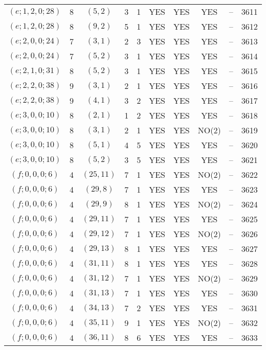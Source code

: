 \begin{longtable}{|c|c|c|c|c|c|c|c|c|c|}
$(e; 1, 2, 0; 28)$ & 8 & $(5, 2)$ & 3 & 1 & YES & YES & YES & -- & 3611\\
$(e; 1, 2, 0; 28)$ & 8 & $(9, 2)$ & 5 & 1 & YES & YES & YES & -- & 3612\\
$(e; 2, 0, 0; 24)$ & 7 & $(3, 1)$ & 2 & 3 & YES & YES & YES & -- & 3613\\
$(e; 2, 0, 0; 24)$ & 7 & $(5, 2)$ & 3 & 1 & YES & YES & YES & -- & 3614\\
$(e; 2, 1, 0; 31)$ & 8 & $(5, 2)$ & 3 & 1 & YES & YES & YES & -- & 3615\\
$(e; 2, 2, 0; 38)$ & 9 & $(3, 1)$ & 2 & 1 & YES & YES & YES & -- & 3616\\
$(e; 2, 2, 0; 38)$ & 9 & $(4, 1)$ & 3 & 2 & YES & YES & YES & -- & 3617\\
$(e; 3, 0, 0; 10)$ & 8 & $(2, 1)$ & 1 & 2 & YES & YES & YES & -- & 3618\\
$(e; 3, 0, 0; 10)$ & 8 & $(3, 1)$ & 2 & 1 & YES & YES & NO(2) & -- & 3619\\
$(e; 3, 0, 0; 10)$ & 8 & $(5, 1)$ & 4 & 5 & YES & YES & YES & -- & 3620\\
$(e; 3, 0, 0; 10)$ & 8 & $(5, 2)$ & 3 & 5 & YES & YES & YES & -- & 3621\\
$(f; 0, 0, 0; 6)$ & 4 & $(25, 11)$ & 7 & 1 & YES & YES & NO(2) & -- & 3622\\
$(f; 0, 0, 0; 6)$ & 4 & $(29, 8)$ & 7 & 1 & YES & YES & YES & -- & 3623\\
$(f; 0, 0, 0; 6)$ & 4 & $(29, 9)$ & 8 & 1 & YES & YES & NO(2) & -- & 3624\\
$(f; 0, 0, 0; 6)$ & 4 & $(29, 11)$ & 7 & 1 & YES & YES & YES & -- & 3625\\
$(f; 0, 0, 0; 6)$ & 4 & $(29, 12)$ & 7 & 1 & YES & YES & NO(2) & -- & 3626\\
$(f; 0, 0, 0; 6)$ & 4 & $(29, 13)$ & 8 & 1 & YES & YES & YES & -- & 3627\\
$(f; 0, 0, 0; 6)$ & 4 & $(31, 11)$ & 8 & 1 & YES & YES & YES & -- & 3628\\
$(f; 0, 0, 0; 6)$ & 4 & $(31, 12)$ & 7 & 1 & YES & YES & NO(2) & -- & 3629\\
$(f; 0, 0, 0; 6)$ & 4 & $(31, 13)$ & 7 & 1 & YES & YES & YES & -- & 3630\\
$(f; 0, 0, 0; 6)$ & 4 & $(34, 13)$ & 7 & 2 & YES & YES & YES & -- & 3631\\
$(f; 0, 0, 0; 6)$ & 4 & $(35, 11)$ & 9 & 1 & YES & YES & NO(2) & -- & 3632\\
$(f; 0, 0, 0; 6)$ & 4 & $(36, 11)$ & 8 & 6 & YES & YES & YES & -- & 3633\\

\end{longtable}
